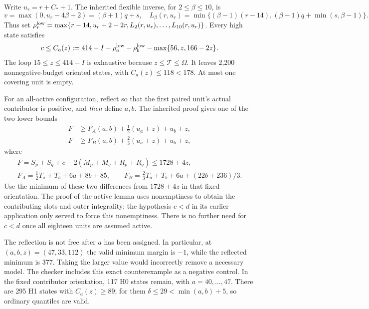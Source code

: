 \documentclass[11pt,a4paper]{article}
\newcommand{\T}{\mathcal T}
\begin{document}
Write $u_r=r+C_*+1$. The inherited flexible inverse, for $2\le\beta\le10$,
is
\[
 v=\max(0,u_r-4\beta+2)=(\beta+1)q+s,
 \quad L_\beta(r,u_r)=\min\{(\beta-1)(r-14),(\beta-1)q+\min(s,\beta-1)\}.
\]
Thus set
$\rho_r^{\rm low}=\max\{r-14,u_r+2-2r,L_2(r,u_r),\ldots,L_{10}(r,u_r)\}$.
Every high state satisfies
\begin{equation}\label{eq:C}
 c\le C_a(z):=414-I-\rho_a^{\rm low}-\rho_b^{\rm low}
                         -\max\{56,z,166-2z\}.
\end{equation}
The loop $15\le z\le414-I$ is exhaustive because $z\le\T\le\Omega$.
It leaves 2,200 nonnegative-budget oriented states, with $C_a(z)\le118<178$.
At most one covering unit is empty.

For an all-active configuration, reflect so that the first paired unit's
actual contributor is positive, and \emph{then} define $a,b$.
The inherited proof gives one of the two lower bounds
\begin{align*}
 F&\ge F_A(a,b)+\tfrac12(u_a+z)+u_b+z,\\
 F&\ge F_B(a,b)+\tfrac23(u_a+z)+u_b+z,
\end{align*}
where
\begin{gather*}
 F=S_p+S_q+c-2(M_p+M_q+R_p+R_q)\le1728+4z,\\
 F_A=\tfrac12T_a+T_b+6a+8b+85,\qquad
 F_B=\tfrac23T_a+T_b+6a+(22b+236)/3.
\end{gather*}
Use the minimum of these two differences from $1728+4z$ in that fixed
orientation. The proof of the active lemma uses nonemptiness to obtain
the contributing slots and outer integrality; the hypothesis $c<d$ in
its earlier application only served to force this nonemptiness.
There is no further need for $c<d$ once all eighteen units are assumed active.

The reflection is not free after $a$ has been assigned. In particular,
at $(a,b,z)=(47,33,112)$ the valid minimum margin is $-1$, while the
reflected minimum is 377. Taking the larger value would incorrectly
remove a necessary model. The checker includes this exact counterexample
as a negative control.
In the fixed contributor orientation, 117 H0 states remain, with
$a=40,\ldots,47$. There are 295 H1 states with $C_a(z)\ge89$;
for them $\delta\le29<\min(a,b)+5$, so ordinary quantiles are valid.
\end{document}
